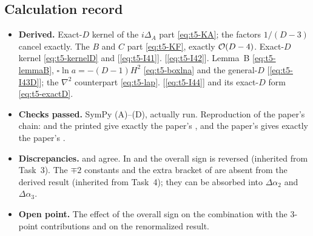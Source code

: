 \subsection{Calculation record}
\begin{itemize}
\item \textbf{Derived.} Exact-\(D\) kernel of the \(i\Delta_A\) part \eqref{eq:t5-KA}; the factors
\(1/(D-3)\) cancel exactly. The \(B\) and \(C\) part \eqref{eq:t5-KF}, exactly \(\mathcal{O}\!\left(D-4\right)\).
Exact-\(D\) kernel \eqref{eq:t5-kernelD} and  [\eqref{eq:t5-I41}]. 
[\eqref{eq:t5-I42}]. Lemma~B \eqref{eq:t5-lemmaB}, \(\square\ln a=-(D-1)H^2\) \eqref{eq:t5-boxlna}
and the general-\(D\)  [\eqref{eq:t5-I43D}]; the \(\nabla^2\) counterpart \eqref{eq:t5-lap}.
 [\eqref{eq:t5-I44}] and its exact-\(D\) form \eqref{eq:t5-exactD}.
\item \textbf{Checks passed.} SymPy (A)--(D), actually run. Reproduction of the paper's chain:
 and the printed  give exactly the paper's , and the paper's 
gives exactly the paper's .
\item \textbf{Discrepancies.}  and  agree. In  and  the overall
sign is reversed (inherited from Task~3). The \(\mp2\) constants and the extra bracket of
 are absent from the derived result (inherited from Task~4); they can be absorbed into
\(\Delta\alpha_2\) and \(\Delta\alpha_3\).
\item \textbf{Open point.} The effect of the overall sign on the combination with the 3-point
contributions and on the renormalized result.
\end{itemize}
